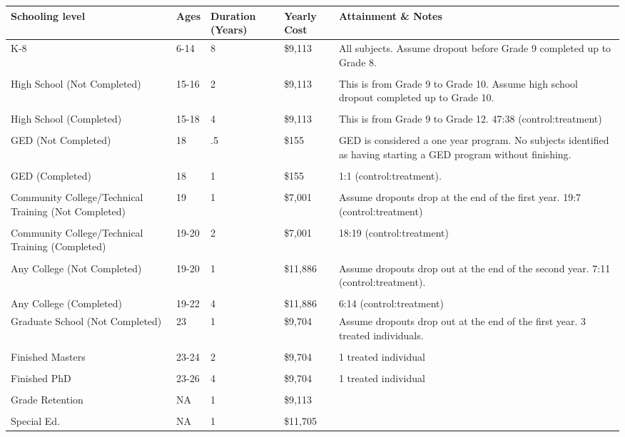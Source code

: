 \begin{tabular}{C{3.5cm} C{1.5cm} C{1.5cm} C{2cm} C{6.5cm}}
\toprule
Schooling level & Ages & Duration (Years) & Yearly Cost &Attainment \& Notes\\ \midrule

K-8 & 6-14 & 8 & \$9,113  & All subjects. Assume dropout before Grade 9 completed up to Grade 8. \\
\\

High School (Not Completed) & 15-16 & 2 &   \$9,113  &  This is from Grade 9 to Grade 10. Assume high school dropout completed up to Grade 10.  \\ \\

High School (Completed) & 15-18 & 4 &   \$9,113  &  This is from Grade 9 to Grade 12. 47:38 (control:treatment) \\ \\

GED (Not Completed) & 18 & .5 &  \$155& GED is considered a one year program. No subjects identified as having starting a GED program without finishing.\\ \\
GED (Completed) & 18 & 1 & \$155 & 1:1 (control:treatment).\\ \\
Community College/Technical Training (Not Completed) &   19 & 1 &  \$7,001 & Assume dropouts drop at the end of the first year. 19:7 (control:treatment) \\ \\
Community College/Technical Training (Completed) & 19-20 & 2 &  \$7,001 & 18:19 (control:treatment)\\ \\
 Any College (Not Completed)   &  19-20 & 1 &  \$11,886 & Assume dropouts drop out at the end of the second year. 7:11 (control:treatment).\\ \\
 Any College (Completed) &  19-22 & 4 & \$11,886 & 6:14 (control:treatment) \\ 
Graduate School (Not Completed) & 23 & 1 &  \$9,704& Assume dropouts drop out at the end of the first year. 3 treated individuals.\\ \\
 Finished Masters &  23-24 & 2 &  \$9,704 & 1 treated individual\\ \\
 Finished PhD & 23-26 & 4 & \$9,704 & 1 treated individual\\ \\
 \midrule
 Grade Retention& NA & 1 &\$9,113 & \\ \\
 Special Ed.& NA & 1 &  \$11,705  & \\ 
 \bottomrule
 \end{tabular}
